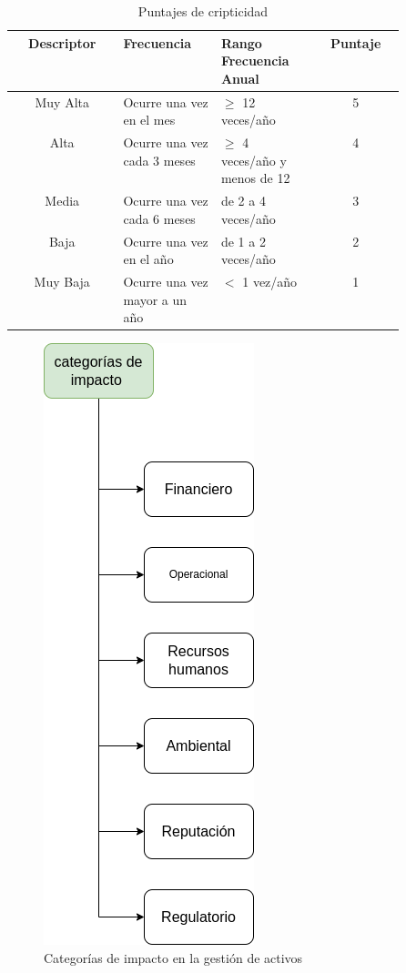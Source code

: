 \documentclass[a5paper]{book}%
\begin{document}
  \begin{table}[H]
    \caption{Puntajes de cripticidad}
   
    \begin{tabular}{|c|p{0.25\linewidth}|p{0.25\linewidth}|c|}
      \hline
      Descriptor &Frecuencia &Rango Frecuencia Anual & Puntaje \\\hline
      Muy Alta&Ocurre una vez en el mes&$\geq$ 12 veces/año&5 \\\hline
      Alta&Ocurre una vez cada 3 meses&$\geq$ 4 veces/año y menos de 12 &4 \\\hline
      Media&Ocurre una vez cada 6 meses& de 2 a 4 veces/año  & 3 \\\hline
      Baja&Ocurre una vez en el año& de 1 a 2 veces/año & 2\\\hline
      Muy Baja&Ocurre una vez mayor a un año& $<$ 1 vez/año&1\\\hline
  \end{tabular}
  \end{table}


  \begin{figure}[H]
    \centering
    \caption{Categorías de impacto en la gestión de activos}
    \label{fig:impacto}
    \includegraphics[width=0.45\linewidth]{categorias_impacto}
  \end{figure}
\end{document}
